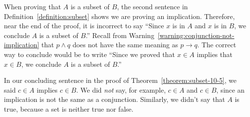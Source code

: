\documentclass{book}
\theoremstyle{ekimcustom}
\begin{document}
\begin{bwarning}{}{}
When proving that $A$ is a subset of $B$, the second sentence in Definition~\ref{definition:subset} shows we are proving an implication. Therefore, near the end of the proof, it is incorrect to say ``Since $x$ is in $A$ and $x$ is in $B$, we conclude $A$ is a subset of $B$.''
\vskip6pt
Recall from Warning~\ref{warning:conjunction-not-implication} that $p \wedge q$ does not have the same meaning as $p \rightarrow q$. The correct way to conclude would be to write ``Since we proved that $x \in A$ implies that $x \in B$, we conclude $A$ is a subset of $B$.''
\end{bwarning}
In our concluding sentence in the proof of Theorem~\ref{theorem:subset-10-5}, we said $c \in A$ implies $c \in B$. We did \emph{not} say, for example, $c \in A$ and $c \in B$, since an implication is not the same as a conjunction. Similarly, we didn't say that $A$ is true, because a set is neither true nor false.
\end{document}
